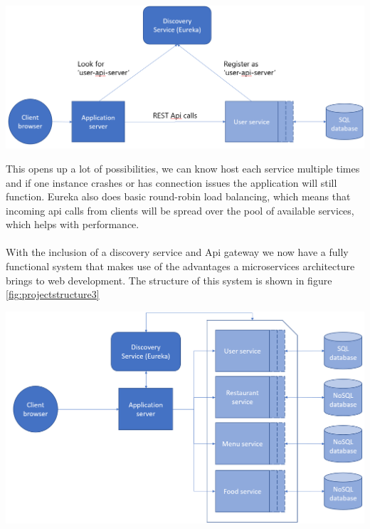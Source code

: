 \documentclass[12pt]{article}
\newenvironment{Figure}
	{\par\medskip\noindent\minipage{\linewidth}}
	{\endminipage\par\medskip}
\begin{document}
\begin{multicols}{2}
\begin{Figure}
	\centering
	\includegraphics[width=\linewidth]{illustrations/discoverydesign.png}
	\label{fig:discovery}
\end{Figure}

\noindent This opens up a lot of possibilities, we can know host each service multiple times and if one instance crashes or has connection issues the application will still function. Eureka also does basic round-robin load balancing, which means that incoming api calls from clients will be spread over the pool of available services, which helps with performance.
\\\\
With the inclusion of a discovery service and Api gateway we now have a fully functional system that makes use of the advantages a microservices architecture brings to web development. The structure of this system is shown in figure \ref{fig:projectstructure3}

\begin{Figure}
	\centering
	\includegraphics[width=\linewidth]{illustrations/projectstructure3.png}
	\label{fig:projectstructure3}
\end{Figure}


\newpage

\end{multicols}
\end{document}
